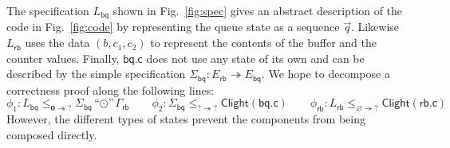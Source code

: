 \documentclass[acmsmall,screen,review,anonymous,nonacm]{acmart}
\newcommand{\kw}[1]{\ensuremath{ \mathsf{#1} }}
\newcommand{\emptysig}{\mathbf0}
\begin{document}
\begin{example} \label{ex:abspec} %
The specification $L_\kw{bq}$ shown in Fig.~\ref{fig:spec}
gives an abstract description of the code in Fig.~\ref{fig:code}
by representing the queue state as a sequence $\vec{q}$.
Likewise $L_\kw{rb}$ uses the data $(b, c_1, c_2)$
to represent the contents of the buffer and the counter values.
Finally,
$\kw{bq.c}$ does not use any state of its own
and can be described by the simple 
specification
$
  \Sigma_\kw{bq} : E_\kw{rb} \twoheadrightarrow E_\kw{bq}
$.
%
We hope to decompose a correctness proof
along the following lines:
\[
    \phi_1 : L_\kw{bq}
      \le_{\emptysig \twoheadrightarrow ?}
      \Sigma_\kw{bq} \! \mathbin{\text{``}{\odot}\text{''}} \Gamma_\kw{rb}
    \qquad
    \phi_2 : \Sigma_\kw{bq}
      \le_{? \twoheadrightarrow ?}
      \kw{Clight}(\kw{bq.c})
    \qquad
    \phi_\kw{rb} : L_\kw{rb}
      \le_{\varnothing \twoheadrightarrow ?}
      \kw{Clight}(\kw{rb.c})
\]
However, the different types of states
prevent the components
from being composed directly.
\end{example}
\end{document}
